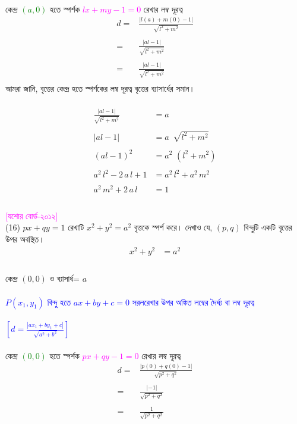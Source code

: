 \documentclass{article}
\begin{document}
	\\
	কেন্দ্র \textcolor{green}{$(a,0)$} হতে স্পর্শক \textcolor{magenta}{$lx+my-1=0$}  রেখার লম্ব দূরত্ব \\
	\begin{align*}
		d=	&\frac{|l(a)+m(0)-1|}{\sqrt{l^2+m^2}}\\
		\\
		=	&	\frac{|al-1|}{\sqrt{l^2+m^2}}\\
		\\
		=	&	\frac{|al-1|}{\sqrt{l^2+m^2}}\\
	\end{align*}
	আমরা জানি, বৃত্তের কেন্দ্র হতে স্পর্শকের লম্ব দূরত্ব বৃত্তের ব্যাসার্ধের সমান। \\
	\\ 
	\begin{align*}
		\frac{|al-1|}{\sqrt{l^2+m^2}}&=a\\
		\\
		|al-1|&=a\,\,\,\sqrt{l^2+m^2}\\
		\\
		(al-1)^2&= a^2\,\,(l^2+m^2)\\
		\\
		a^2\,l^2-2\,a\,l+1&=a^2\,l^2+a^2\,m^2\\
		\\
		a^2\,m^2+2\,a\,l&=1\\
	\end{align*}
	\\ 
	\textcolor{magenta}{[যশোর বোর্ড-২০১২]}\\
(16)	$px+qy=1$ রেখাটি $x^2+y^2=a^2$ বৃত্তকে স্পর্শ করে। দেখাও যে,  $(p,q)$ বিন্দুটি একটি বৃত্তের উপর অবস্থিত। \\
	\begin{align*}
		x^2+y^2&=a^2\\
	\end{align*}
	\\
	কেন্দ্র 	$(0,0)$ ও ব্যাসার্ধ= $a$\\
	\\   
	\textcolor{blue}{$P(x_1,y_1)$ বিন্দু হতে  $ax+by+c=0$ সরলরেখার উপর অঙ্কিত লম্বের দৈর্ঘ্য বা লম্ব দূরত্ব \\
		\\
		$\left[d=\frac{|ax_1+by_1+c|}{\sqrt{a^2+b^2}}\right]$}\\
	\\
	কেন্দ্র \textcolor{green}{$(0,0)$} হতে স্পর্শক \textcolor{magenta}{$px+qy-1=0$}  রেখার লম্ব দূরত্ব \\
	\begin{align*}
		d=	&\frac{|p(0)+q(0)-1|}{\sqrt{p^2+q^2}}\\
		\\
		=	&	\frac{|-1|}{\sqrt{p^2+q^2}}\\
		\\
		=	&	\frac{1}{\sqrt{p^2+q^2}}\\
	\end{align*}
\end{document}
